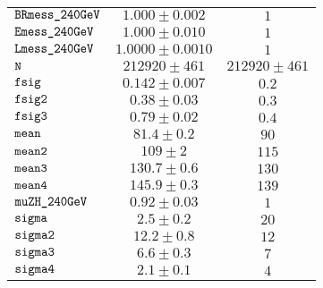 \begin{tabular}{lcc}
$\verb+BRmess_240GeV+ $ & $  1.000\pm 0.002$ & $ 1$\\
$\verb+Emess_240GeV+ $ & $  1.000\pm 0.010$ & $ 1$\\
$\verb+Lmess_240GeV+ $ & $  1.0000\pm 0.0010$ & $ 1$\\
$\verb+N+ $ & $  212920\pm 461$ & $ 212920\pm 461$\\
$\verb+fsig+ $ & $  0.142\pm 0.007$ & $ 0.2$\\
$\verb+fsig2+ $ & $  0.38\pm 0.03$ & $ 0.3$\\
$\verb+fsig3+ $ & $  0.79\pm 0.02$ & $ 0.4$\\
$\verb+mean+ $ & $  81.4\pm 0.2$ & $ 90$\\
$\verb+mean2+ $ & $  109\pm 2$ & $ 115$\\
$\verb+mean3+ $ & $  130.7\pm 0.6$ & $ 130$\\
$\verb+mean4+ $ & $  145.9\pm 0.3$ & $ 139$\\
$\verb+muZH_240GeV+ $ & $  0.92\pm 0.03$ & $ 1$\\
$\verb+sigma+ $ & $  2.5\pm 0.2$ & $ 20$\\
$\verb+sigma2+ $ & $  12.2\pm 0.8$ & $ 12$\\
$\verb+sigma3+ $ & $  6.6\pm 0.3$ & $ 7$\\
$\verb+sigma4+ $ & $  2.1\pm 0.1$ & $ 4$\\
\end{tabular}

